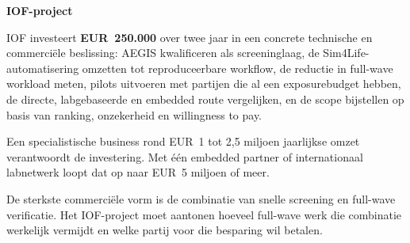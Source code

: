 \documentclass[10pt,a4paper]{article}
\begin{document}
\textbf{IOF-project}

IOF investeert \textbf{EUR~250.000} over twee jaar in een concrete technische en commerciële beslissing: AEGIS kwalificeren als screeninglaag, de Sim4Life-automatisering omzetten tot reproduceerbare workflow, de reductie in full-wave workload meten, pilots uitvoeren met partijen die al een exposurebudget hebben, de directe, labgebaseerde en embedded route vergelijken, en de scope bijstellen op basis van ranking, onzekerheid en willingness to pay.

Een specialistische business rond EUR~1 tot 2,5 miljoen jaarlijkse omzet verantwoordt de investering. Met één embedded partner of internationaal labnetwerk loopt dat op naar EUR~5 miljoen of meer.

De sterkste commerciële vorm is de combinatie van snelle screening en full-wave verificatie. Het IOF-project moet aantonen hoeveel full-wave werk die combinatie werkelijk vermijdt en welke partij voor die besparing wil betalen.
\end{document}
